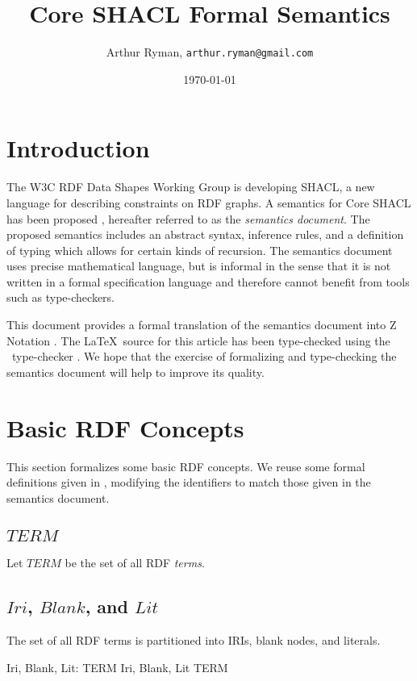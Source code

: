 \documentclass{article}
\title{Core SHACL Formal Semantics}
\author{Arthur Ryman, {\tt arthur.ryman@gmail.com}}
\date{\today}
\begin{document}


\maketitle


\section{Introduction}
\label{sec-introduction}
The W3C RDF Data Shapes Working Group \cite{w3c:shapeswg} is developing SHACL, a new language for describing constraints on RDF graphs.
A semantics for Core SHACL has been proposed \cite{iovka:core-shacl}, hereafter referred to as the {\em semantics document}.
The proposed semantics includes an abstract syntax, inference rules, and a definition of typing which allows for certain kinds of recursion.
The semantics document uses precise mathematical language, but is informal in the sense that it is not written in a formal specification language
and therefore cannot benefit from tools such as type-checkers.

This document provides a formal translation of the semantics document into Z Notation  \cite{spivey:zrm}.
The \LaTeX\ source for this article has been type-checked using the \fuzz\ type-checker \cite{spivey:fuzz}.
We hope that the exercise of formalizing and type-checking the semantics document will help to improve its quality. 

\section{Basic RDF Concepts}
\label{sec-basic-rdf-concepts}
This section formalizes some basic RDF concepts.
We reuse some formal definitions given in \cite{arthur:recursion}, modifying the identifiers to match those given in the semantics document.

\subsection{$TERM$}
Let $TERM$ be the set of all RDF {\em terms}.
\begin{zed}
	[TERM]
\end{zed}

\subsection{$Iri$, $Blank$, and $Lit$}
The set of all RDF terms is partitioned into IRIs, blank nodes, and literals.
\begin{axdef}
	Iri, Blank, Lit: \power TERM
\where
	\langle Iri, Blank, Lit \rangle \partition TERM
\end{axdef}
\end{document}

